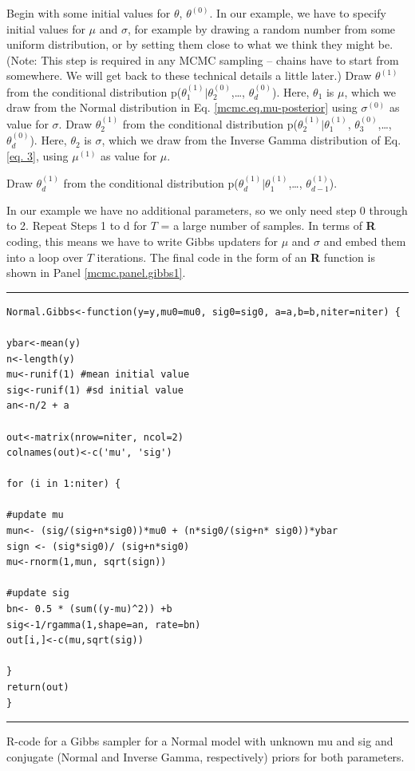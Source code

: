 { Begin with some initial values for $\theta$, $\theta^{(0)}$.   }
In our example, we have to specify initial values for $\mu$ and $\sigma$, for
example by drawing a random number from some uniform distribution, or
by setting them close to what we think they might be. (Note: This step
is required in any MCMC sampling – chains have to start from
somewhere. We will get back to these technical details a little
later.)
{ Draw $\theta^{(1)}$ from the conditional distribution p($\theta_{1}^{(1)}|\theta_{2}^{(0)}$,\ldots, $\theta_{d}^{(0)}$). }
Here, $\theta_1$ is $\mu$, which we draw from the Normal distribution in Eq. \ref{mcmc.eq.mu-posterior}  using $\sigma^{(0)}$ as value for $\sigma$.
{ Draw $\theta_{2}^{(1)}$ from the conditional distribution p($\theta_{2}^{(1)}|\theta_{1}^{(1)}$, $\theta_{3}^{(0)}$,\ldots, $\theta_{d}^{(0)}$). }
Here, $\theta_2$ is $\sigma$, which we draw from the Inverse Gamma
distribution of Eq. \ref{eq. 3}, using $\mu^{(1)}$ as value for $\mu$.

{ Draw $\theta_{d}^{(1)}$ from the conditional distribution p($\theta_{d}^{(1)}|\theta_{1}^{(1)}$,\ldots, $\theta_{d-1}^{(1)}$). }

In our example we have no additional parameters, so we only need step 0 through to 2.
Repeat Steps 1 to d for $T$ = a large number of samples.
In terms of {\bf R} coding, this means we have to write Gibbs updaters for
$\mu$ and $\sigma$ and embed them into a loop over $T$ iterations. The final
code in the form of an {\bf R} function is shown 
in Panel \ref{mcmc.panel.gibbs1}.


\begin{panel}[htp]
\centering
\rule[0.15in]{\textwidth}{.03in}
\begin{verbatim}
Normal.Gibbs<-function(y=y,mu0=mu0, sig0=sig0, a=a,b=b,niter=niter) {

ybar<-mean(y)
n<-length(y)
mu<-runif(1) #mean initial value
sig<-runif(1) #sd initial value
an<-n/2 + a

out<-matrix(nrow=niter, ncol=2)
colnames(out)<-c('mu', 'sig')

for (i in 1:niter) {

#update mu
mun<- (sig/(sig+n*sig0))*mu0 + (n*sig0/(sig+n* sig0))*ybar
sign <- (sig*sig0)/ (sig+n*sig0)
mu<-rnorm(1,mun, sqrt(sign))

#update sig
bn<- 0.5 * (sum((y-mu)^2)) +b
sig<-1/rgamma(1,shape=an, rate=bn)
out[i,]<-c(mu,sqrt(sig))

}
return(out)
}
\end{verbatim}
\rule[-0.15in]{\textwidth}{.03in}
\caption{
R-code for a Gibbs sampler for a Normal model with unknown mu
and sig and conjugate (Normal and Inverse Gamma, respectively) priors
for both parameters.
}
\label{mcmc.panel.m0}
\end{panel}













